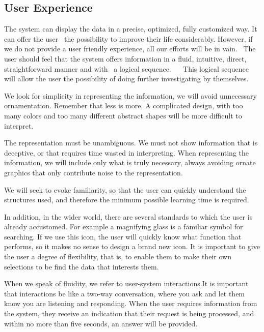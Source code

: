\subsection{User Experience}
The system can display the data in a precise, optimized, fully customized way. It can offer the user
 the possibility to improve their life considerably. However, if we do not provide a user friendly experience, all our efforts will be in vain.
 The user should feel that the system offers information in a fluid, intuitive, direct, straightforward manner and with
 a logical sequence.
  
This logical sequence will allow the user the possibility of doing further investigating by themselves.

We look for simplicity in representing the information, we will avoid unnecessary ornamentation. Remember that less is more. A complicated design, with too many colors and too many different abstract shapes will be more difficult to interpret.

The representation must be unambiguous. We must not show information that is deceptive, or that requires time wasted in interpreting. When representing the information, we will 
include only what is truly necessary, always avoiding ornate graphics that only contribute noise to the representation.

We will seek to evoke familiarity, so that the user can quickly understand the structures used,
and therefore the minimum possible learning time is required.

In addition, in the wider world, there are several standards to which the user is already accustomed.
For example a magnifying glass is a familiar symbol for searching. If we use this icon, the user will quickly know what
function that performs, so it makes no sense to design a brand new icon.
It is important to give the user a degree of flexibility, that is, to enable them to make their own selections to be find the data that interests them.

When we speak of fluidity, we refer to user-system interactions.It is important that interactions
be like a two-way conversation, where you ask and let them know you are listening and responding. When the user
requires information from the system, they receive an indication that their request is being processed, and within no more than five seconds, an answer will be provided.
    
